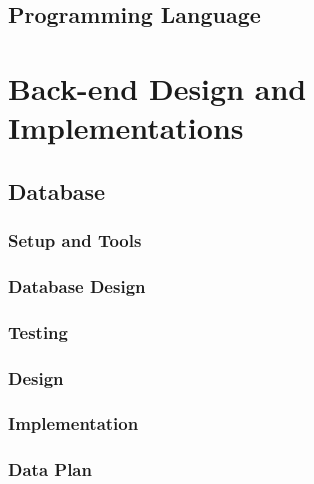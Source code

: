 \subsection{Programming Language}
\label{subsec:Methodology}


\section{Back-end Design and Implementations}
\label{sec:sec03}

\subsection{Database}
\label{subsec:database}

\subsubsection{Setup and Tools}
\label{subsubsec:dbsetup}


\subsubsection{Database Design}
\label{subsubsec:Database Design}


\subsubsection{Testing}
\label{subsubsec:dbtesting}


\subsubsection{Design}
\label{subsubsec:dbdesign}


\subsubsection{Implementation}
\label{subsubsec:dbimplementation}


\subsubsection{Data Plan}
\label{subsubsec:dbdataplan}

